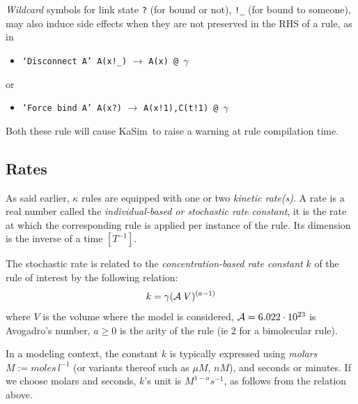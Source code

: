 \documentclass[11pt]{book}
\def\KaSim{\textsf{KaSim}}
\def\ttt#1{\texttt{#1}}
\def\rar{\rightarrow}
\def\ka{\kappa}
\def\ga{\gamma}
\def\ie{ie }
\def\ITE#1{\begin{itemize}#1\end{itemize}}
\def\mit#1{{\mathit #1}}
\begin{document}
\emph{Wildcard} symbols for link state \ttt{?} (for bound or not), \ttt{!\_} (for bound to someone), may also induce side effects when they are not preserved in the RHS of a rule, as in
\ITE{
\item[] \ttt{`Disconnect A' A(x!\_)} $\rar$ \ttt{A(x) @ $\ga$} 
}
or 
\ITE{
\item[] \ttt{`Force bind A' A(x?)} $\rar$ \ttt{A(x!1),C(t!1) @ $\ga$} 
}
Both these rule will cause \KaSim~to raise a warning at rule compilation time.

\subsection{Rates}\label{sec:kinetics}
As said earlier, $\ka$ rules are equipped with one or two \emph{kinetic rate(s)}. A rate is a real number called the \emph{individual-based or stochastic rate constant}, it is the rate at which the corresponding rule is applied per instance of the rule. Its dimension is the inverse of a time $[T^{-1}]$.

The stochastic rate is related to the \emph{concentration-based rate constant} $k$ of the rule of interest by the following relation:
%
%
\begin{equation}\label{stochrate}
k = \ga{({\cal A}\; V)^{(a-1)}} %
\end{equation}
where 
$V$ is the volume where the model is considered,
${\cal A}= 6.022\cdot 10^{23}$ is Avogadro's number, %
$a\geq0$ is the arity of the rule (\ie 2 for a bimolecular rule).

In a modeling context, the constant $k$ is typically expressed using \emph{molars} $M:=\mit{moles}\,l^{-1}$ (or variants thereof such
as $\mu M$, $nM$), and seconds or minutes. If we choose molars and seconds, $k$'s unit is $\mathit{M}^{1-a}\mathit{s}^{-1}$, as 
follows from the relation above.
\end{document}
